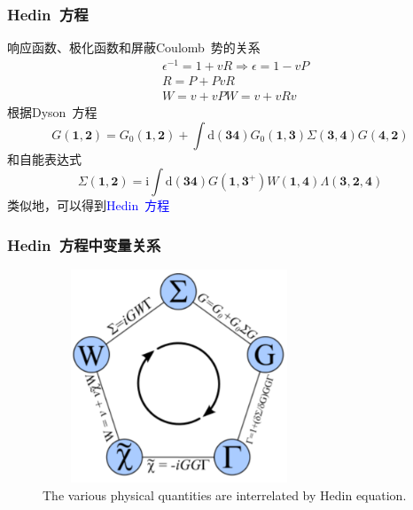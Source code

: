 \documentclass[cjk,slidestop,compress,mathserif,blue]{beamer}
\begin{document}
\frame
{
	\frametitle{\textrm{Hedin~}方程}
	响应函数、极化函数和屏蔽\textrm{Coulomb~}势的关系
	\begin{displaymath}
		\begin{aligned}
			&\epsilon^{-1}=1+vR\Rightarrow\epsilon=1-vP\\
			&R=P+PvR\\
			&W=v+vPW=v+vRv
		\end{aligned}
	\end{displaymath}
	根据\textrm{Dyson~}方程
	\begin{displaymath}
		G(\mathbf{1},\mathbf{2})=G_0(\mathbf{1},\mathbf{2})+\int\mathrm{d}(\mathbf{34})G_0(\mathbf{1},\mathbf{3})\Sigma(\mathbf{3},\mathbf{4})G(\mathbf{4},\mathbf{2})
	\end{displaymath}
	和自能表达式
	\begin{displaymath}
		\Sigma(\mathbf{1},\mathbf{2})=\mathrm{i}\int\mathrm{d}(\mathbf{34})G(\mathbf{1},\mathbf{3}^{+})W(\mathbf{1},\mathbf{4})\Lambda(\mathbf{3},\mathbf{2},\mathbf{4})
	\end{displaymath}
	类似地，可以得到\textcolor{blue}{\textrm{Hedin~}方程}
	\vskip -8pt
	\fontsize{8.5pt}{6.2pt}
}

\frame
{
	\frametitle{\textrm{Hedin~}方程中变量关系}
\begin{figure}[h!]
\centering
\vspace*{-0.2in}
\includegraphics[height=2.5in,width=3.2in,viewport=0 0 680 600,clip]{Figures/GW_Hedin_eq.png}
\caption{\small \textrm{The various physical quantities are interrelated by Hedin equation.}}%
\label{GW_Hedin_eq}
\end{figure} 
}
\end{document}
